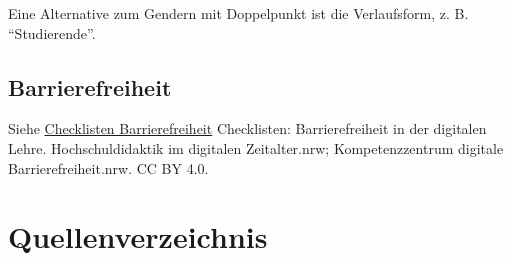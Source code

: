 \documentclass[
  letterpaper,
  DIV=11]{scrartcl}
\begin{document}
Eine Alternative zum Gendern mit Doppelpunkt ist die Verlaufsform, z. B.
``Studierende''.

\subsection{Barrierefreiheit}\label{barrierefreiheit}

Siehe
\href{https://digitale-lehre.uni-siegen.de/wp-content/uploads/2023/09/Checkliste_Barrierefreiheit-in-der-digitalen-Lehre_Sept23.pdf}{Checklisten
Barrierefreiheit} Checklisten: Barrierefreiheit in der digitalen Lehre.
Hochschuldidaktik im digitalen Zeitalter.nrw; Kompetenzzentrum digitale
Barrierefreiheit.nrw. CC BY 4.0.

\section*{Quellenverzeichnis}\label{quellenverzeichnis}

\printbibliography[heading=none]


\printbibliography[title=Quellen]
\end{document}

